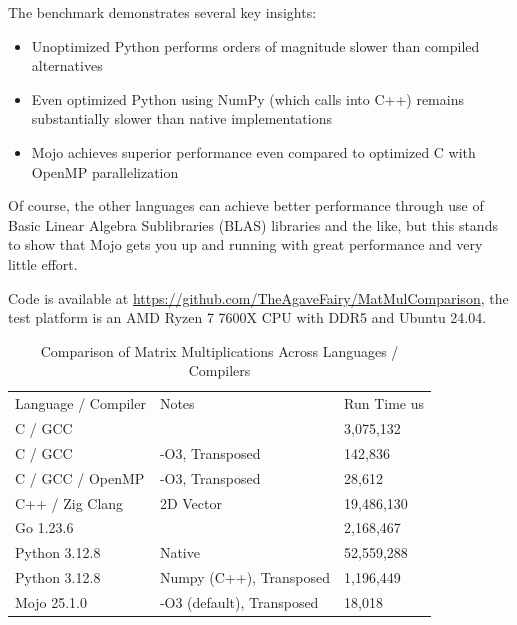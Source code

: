 \documentclass[manuscript,screen,review,format=acmsmall]{acmart}
\begin{document}
The benchmark demonstrates several key insights:
\begin{itemize}
    \item Unoptimized Python performs orders of magnitude slower than compiled alternatives
    \item Even optimized Python using NumPy (which calls into C++) remains substantially slower than native implementations
    \item Mojo achieves superior performance even compared to optimized C with OpenMP parallelization
\end{itemize}

Of course, the other languages can achieve better performance through use of Basic Linear Algebra Sublibraries (BLAS) libraries and the like, but this stands to show that Mojo gets you up and running with great performance and very little effort.

Code is available at \url{https://github.com/TheAgaveFairy/MatMulComparison}, the test platform is an AMD Ryzen 7 7600X CPU with DDR5 and Ubuntu 24.04.


\begin{table}[h]
    \caption{Comparison of Matrix Multiplications Across Languages / Compilers}
    \begin{tabular}{lll}
    Language / Compiler & Notes                    & Run Time us \\
    C / GCC             &                          & 3,075,132   \\
    C / GCC             & -O3, Transposed          & 142,836     \\
    C / GCC / OpenMP    & -O3, Transposed          & 28,612      \\
    C++ / Zig Clang     & 2D Vector                & 19,486,130  \\
    Go 1.23.6           &                          & 2,168,467   \\
    Python 3.12.8       & Native                   & 52,559,288  \\
    Python 3.12.8       & Numpy (C++), Transposed  & 1,196,449   \\
    Mojo 25.1.0         & -O3 (default), Transposed& 18,018      \\
    \end{tabular}
    \label{table:matmuls}
\end{table}
\end{document}
